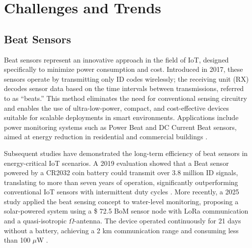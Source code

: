 \documentclass[conference]{IEEEtran}
\begin{document}
\section{Challenges and Trends} \label{cap:challenges}

\subsection{Beat Sensors}



Beat sensors represent an innovative approach in the field of IoT, designed specifically to minimize power consumption and cost. Introduced in 2017, these sensors operate by transmitting only ID codes wirelessly; the receiving unit (RX) decodes sensor data based on the time intervals between transmissions, referred to as “beats.” This method eliminates the need for conventional sensing circuitry and enables the use of ultra-low-power, compact, and cost-effective devices suitable for scalable deployments in smart environments. Applications include power monitoring systems such as Power Beat and DC Current Beat sensors, aimed at energy reduction in residential and commercial buildings \cite{ishibashi_2017_beat}.

Subsequent studies have demonstrated the long-term efficiency of beat sensors in energy-critical IoT scenarios. A 2019 evaluation showed that a Beat sensor powered by a CR2032 coin battery could transmit over 3.8 million ID signals, translating to more than seven years of operation, significantly outperforming conventional IoT sensors with intermittent duty cycles \cite{ishibashi_2019_long}. More recently, a 2025 study applied the beat sensing concept to water-level monitoring, proposing a solar-powered system using a \$ 72.5 BoM sensor node with LoRa communication and a quasi-isotropic $\Omega$-antenna. The device operated continuously for 21 days without a battery, achieving a 2 km communication range and consuming less than 100 $\mu$W \cite{dao_2025_lowcost}.
\end{document}
